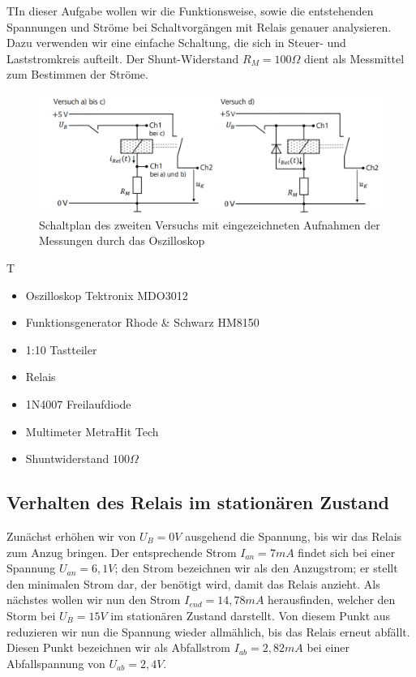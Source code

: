 \documentclass{article}
\begin{document}
\begin{task}
    TIn dieser Aufgabe wollen wir die Funktionsweise, sowie die entstehenden Spannungen und Ströme bei Schaltvorgängen mit Relais
    genauer analysieren. Dazu verwenden wir eine einfache Schaltung, die sich in Steuer- und Laststromkreis aufteilt. Der Shunt-Widerstand $R_M = 100\Omega$ dient als Messmittel
    zum Bestimmen der Ströme.
\end{task}
\begin{figure}[h]
    \begin{center}
        \includegraphics[scale=0.8]{../assets/images/ET2P4/Schaltplan2.PNG}
        \caption{Schaltplan des zweiten Versuchs mit eingezeichneten Aufnahmen der Messungen durch das Oszilloskop}
    \end{center}
\end{figure}



\begin{devlist}
    T\begin{itemize}
        \item Oszilloskop Tektronix MDO3012
        \item Funktionsgenerator Rhode \& Schwarz HM8150
        \item 1:10 Tastteiler
        \item Relais
        \item 1N4007 Freilaufdiode
        \item Multimeter MetraHit Tech
        \item Shuntwiderstand $100\Omega$
    \end{itemize}
\end{devlist}


\subsection{Verhalten des Relais im stationären Zustand}

Zunächst erhöhen wir von $U_B = 0V$ ausgehend die Spannung, bis wir das Relais zum Anzug bringen. Der entsprechende Strom $I_{an} = 7mA$ findet sich bei einer Spannung $U_{an} = 6,1V$; den Strom bezeichnen wir als 
den Anzugstrom; er stellt den minimalen Strom dar, der benötigt wird, damit das Relais anzieht.
Als nächstes wollen wir nun den Strom $I_{end} = 14,78mA$ herausfinden, welcher den Storm bei $U_B = 15V$ im stationären Zustand darstellt. Von diesem Punkt aus
reduzieren wir nun die Spannung wieder allmählich, bis das Relais erneut abfällt. Diesen Punkt bezeichnen wir als Abfallstrom $I_{ab} = 2,82mA$ bei einer Abfallspannung von $U_{ab} = 2,4V$.
\end{document}
